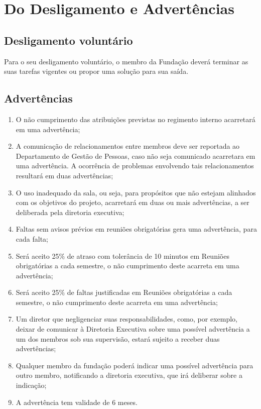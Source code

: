 \chapter{Do Desligamento e Advertências}
    \section{Desligamento voluntário}
        Para o seu desligamento voluntário, o membro da Fundação deverá terminar as suas tarefas
vigentes ou propor uma solução para sua saída.

        
    \section{Advertências}
    \begin{enumerate}
        \item O não cumprimento das atribuições previstas no regimento interno acarretará em uma advertência;
        \item A comunicação de relacionamentos entre membros deve ser reportada ao Departamento de Gestão de Pessoas, caso não seja comunicado acarretara em uma advertência. A ocorrência de problemas envolvendo tais relacionamentos resultará em duas advertências;
        \item O uso inadequado da sala, ou seja, para propósitos que não estejam alinhados com os objetivos do projeto, acarretará em duas ou mais advertências, a ser deliberada pela diretoria executiva;
        \item Faltas sem avisos prévios em reuniões obrigatórias gera uma advertência, para cada falta;
        \item Será aceito 25$\%$ de atraso com tolerância de 10 minutos em Reuniões obrigatórias a cada semestre, o não cumprimento deste acarreta em uma advertência; 
        \item Será aceito 25$\%$ de faltas justificadas em Reuniões obrigatórias a cada semestre, o não cumprimento deste acarreta em uma advertência;
        \item Um diretor que negligenciar suas responsabilidades, como, por exemplo, deixar de comunicar à Diretoria Executiva sobre uma possível advertência a um dos membros sob sua supervisão, estará sujeito a receber duas advertências;
        \item Qualquer membro da fundação poderá indicar uma possível advertência para outro membro, notificando a diretoria executiva, que irá deliberar sobre a indicação;
        \item A advertência tem validade de 6 meses.
    \end{enumerate}
    
